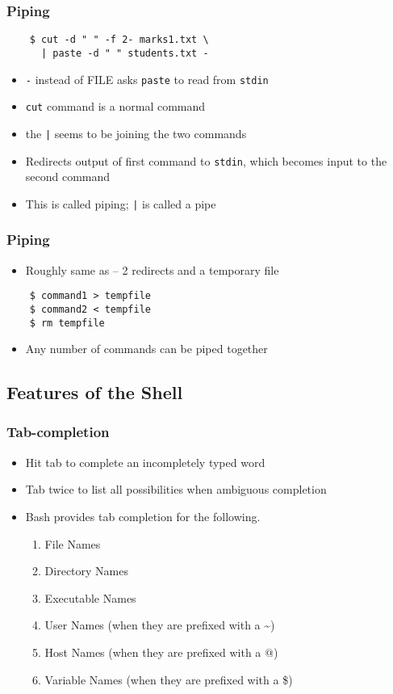 \documentclass[12pt,compress]{beamer}
\begin{document}
\begin{frame}[fragile]
  \frametitle{Piping}
  \begin{lstlisting}
    $ cut -d " " -f 2- marks1.txt \
      | paste -d " " students.txt -
  \end{lstlisting} %
  \begin{itemize}
  \item \texttt{-} instead of FILE asks \texttt{paste} to read from
    \texttt{stdin}
  \item \texttt{cut} command is a normal command
  \item the \texttt{|} seems to be joining the two commands
  \item Redirects output of first command to \texttt{stdin}, which
    becomes input to the second command
  \item This is called piping; \texttt{|} is called a pipe
  \end{itemize}
\end{frame}

\begin{frame}[fragile]
  \frametitle{Piping}
  \begin{itemize}
  \item Roughly same as -- 2 redirects and a temporary file
  \end{itemize}
  \begin{lstlisting}
    $ command1 > tempfile
    $ command2 < tempfile
    $ rm tempfile
  \end{lstlisting} %
  \begin{itemize}
  \item Any number of commands can be piped together
  \end{itemize}
\end{frame}

\subsection{Features of the Shell}

\begin{frame}[fragile]
  \frametitle{Tab-completion}
  \begin{itemize}
  \item Hit tab to complete an incompletely typed word
  \item Tab twice to list all possibilities when ambiguous completion
  \item Bash provides tab completion for the following.
    \begin{enumerate}
    \item File Names
    \item Directory Names
    \item Executable Names
    \item User Names (when they are prefixed with a \~{})
    \item Host Names (when they are prefixed with a @)
    \item Variable Names (when they are prefixed with a \$)
    \end{enumerate}
  \end{itemize}
\end{frame}
\end{document}
